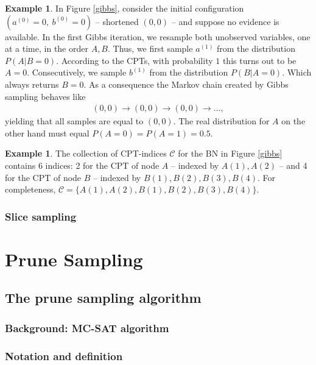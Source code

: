 \documentclass[a4paper, twoside, 11pt]{report}
\theoremstyle{plain}
\theoremstyle{definition}
\newtheorem{example}[thm]{Example}
\theoremstyle{remark}
\newcommand{\C}{{\mathcal C}}
\begin{document}
\begin{example}\label{ex:gibbs}
In Figure \ref{gibbs}, consider the initial configuration $(a^{(0)} = 0,\ b^{(0)} = 0)$ -- shortened $(0,0)$ -- and suppose no evidence is available. 
In the first Gibbs iteration, we resample both unobserved variables, one at a time, in the order $A, B$. Thus, we first sample $a^{(1)}$ from the distribution $P(A | B = 0)$. According to the CPTs, with probability $1$ this turns out to be $A=0$. Consecutively, we sample $b^{(1)}$ from the distribution $P(B | A = 0 )$. Which always returns $B = 0$. As a consequence the Markov chain created by Gibbs sampling behaves like
\begin{align*}\label{gibbs-trap}
(0,0) \to (0,0) \to (0,0) \to \ldots ,
\end{align*}
yielding that all samples are equal to $(0,0)$. The real distribution for $A$ on the other hand must equal $P(A=0) = P(A=1) = 0.5$.
\end{example}

\begin{example} The collection of CPT-indices $\C$ for the BN in Figure \ref{gibbs} contains 6 indices: 2 for the CPT of node $A$ -- indexed by $A(1), A(2)$ -- and 4 for the CPT of node $B$ -- indexed by $B(1), B(2), B(3), B(4)$. For completeness, $\C = \{ A(1), A(2), B(1), B(2), B(3), B(4) \}$.
\end{example}



\subsection{Slice sampling}


\chapter{Prune Sampling}

\section{The prune sampling algorithm}

\subsection{Background: MC-SAT algorithm}

\subsection{Notation and definition}
\end{document}
